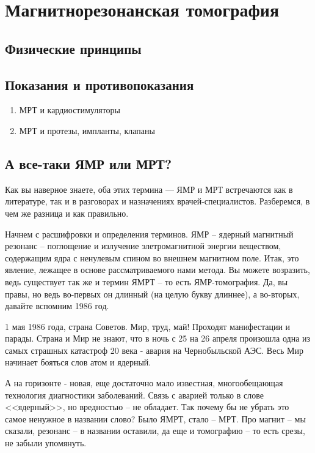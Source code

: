 \section{Магнитнорезонанская томография}

\subsection{Физические принципы}

\subsection{Показания и противопоказания}

\begin{enumerate}
\item МРТ и кардиостимуляторы
\item МРТ и протезы, импланты, клапаны
\end{enumerate}


\subsection{А все-таки ЯМР или МРТ?}
Как вы наверное знаете, оба этих термина --- ЯМР и МРТ встречаются как в литературе, так и в разговорах и назначениях врачей-специалистов. Разберемся, в чем же разница и как правильно.

Начнем с расшифровки и определения терминов. ЯМР -- ядерный магнитный резонанс -- поглощение и излучение элетромагнитной энергии веществом, содержащим ядра с ненулевым спином во внешнем магнитном поле. Итак, это явление, лежащее в основе рассматриваемого нами метода. Вы можете возразить, ведь существует так же и термин ЯМРТ -- то есть ЯМР-томография. Да, вы правы, но ведь во-первых он длинный (на целую букву длиннее), а во-вторых, давайте вспомним 1986 год.

1 мая 1986 года, страна Советов. Мир, труд, май! Проходят манифестации и парады. Страна и Мир не знают, что в ночь с 25 на 26 апреля произошла одна из самых страшных катастроф 20 века - авария на Чернобыльской АЭС. Весь Мир начинает бояться слов атом и ядерный. 

А на горизонте - новая, еще достаточно мало известная, многообещающая технология диагностики заболеваний. Связь с аварией только в слове <<ядерный>>, но вредностью -- не обладает. Так почему бы не убрать это самое ненужное в названии слово? Было ЯМРТ, стало -- МРТ. Про магнит -- мы сказали, резонанс -- в названии оставили, да еще и томографию -- то есть срезы, не забыли упомянуть. 


